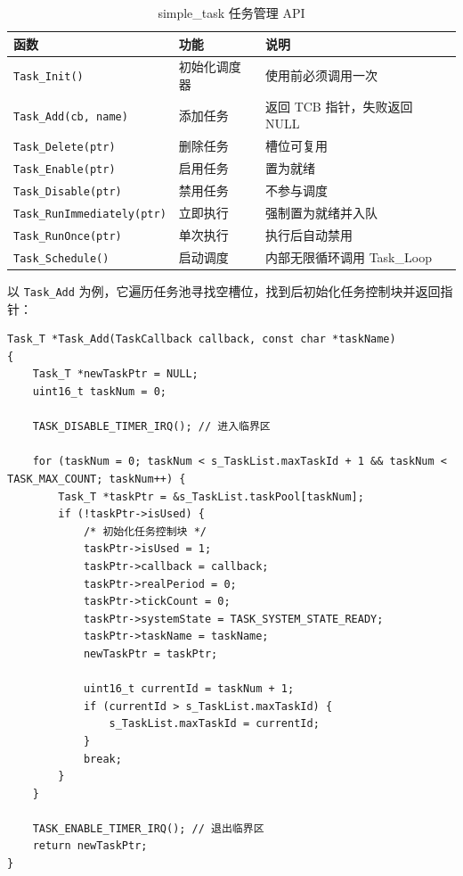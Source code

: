 \begin{table}[htbp]
\centering \caption{simple\_task 任务管理 API} \label{tab:task-api}
    \begin{tabular}{lll}
        \toprule
        函数 & 功能 & 说明 \\
        \midrule
        \texttt{Task\_Init()}          & 初始化调度器 & 使用前必须调用一次 \\
        \texttt{Task\_Add(cb, name)}   & 添加任务 & 返回 TCB 指针，失败返回 NULL \\
        \texttt{Task\_Delete(ptr)}     & 删除任务 & 槽位可复用 \\
        \texttt{Task\_Enable(ptr)}     & 启用任务 & 置为就绪 \\
        \texttt{Task\_Disable(ptr)}    & 禁用任务 & 不参与调度 \\
        \texttt{Task\_RunImmediately(ptr)} & 立即执行 & 强制置为就绪并入队 \\
        \texttt{Task\_RunOnce(ptr)}    & 单次执行 & 执行后自动禁用 \\
        \texttt{Task\_Schedule()}      & 启动调度 & 内部无限循环调用 Task\_Loop \\
        \bottomrule
    \end{tabular}
\end{table}

以 \texttt{Task\_Add} 为例，它遍历任务池寻找空槽位，找到后初始化任务控制块并返回指针：

\begin{lstlisting}[style=c]
Task_T *Task_Add(TaskCallback callback, const char *taskName)
{
    Task_T *newTaskPtr = NULL;
    uint16_t taskNum = 0;

    TASK_DISABLE_TIMER_IRQ(); // 进入临界区

    for (taskNum = 0; taskNum < s_TaskList.maxTaskId + 1 && taskNum < TASK_MAX_COUNT; taskNum++) {
        Task_T *taskPtr = &s_TaskList.taskPool[taskNum];
        if (!taskPtr->isUsed) {
            /* 初始化任务控制块 */
            taskPtr->isUsed = 1;
            taskPtr->callback = callback;
            taskPtr->realPeriod = 0;
            taskPtr->tickCount = 0;
            taskPtr->systemState = TASK_SYSTEM_STATE_READY;
            taskPtr->taskName = taskName;
            newTaskPtr = taskPtr;

            uint16_t currentId = taskNum + 1;
            if (currentId > s_TaskList.maxTaskId) {
                s_TaskList.maxTaskId = currentId;
            }
            break;
        }
    }

    TASK_ENABLE_TIMER_IRQ(); // 退出临界区
    return newTaskPtr;
}
\end{lstlisting}
